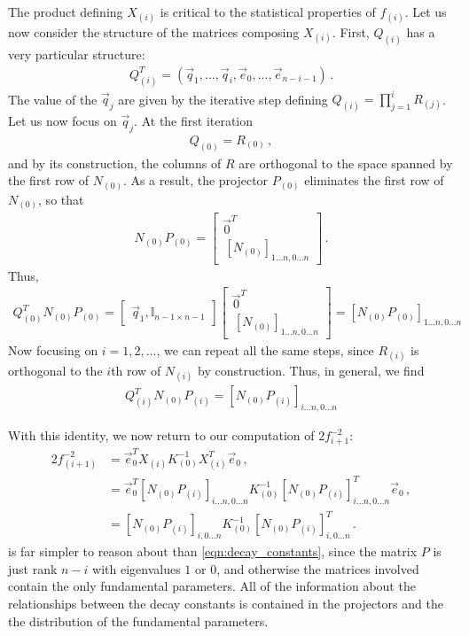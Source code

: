 \documentclass[11pt]{article}
\begin{document}
The product defining $X_{(i)}$ is critical to the statistical properties of $f_{(i)}$. Let us now consider the structure of the matrices composing $X_{(i)}$. First, $Q_{(i)}$ has a very particular structure:
\begin{align}
    Q_{(i)}^T = (\vec q_1,\dots,\vec q_{i},\vec e_0,\dots,\vec e_{n - i-1})\,.
\end{align}
The value of the $\vec q_{j}$ are given by the iterative step defining $Q_{(i)} = \prod_{j = 1}^i R_{(j)}$. Let us now focus on $\vec q_j$. At the first iteration
\begin{align}
    Q_{(0)} = R_{(0)}\,,
\end{align}
and by its construction, the columns of $R$ are orthogonal to the space spanned by the first row of $N_{(0)}$. As a result, the projector $P_{(0)}$ eliminates the first row of $N_{(0)}$, so that
\begin{align}
    N_{(0)}P_{(0)} = \left[\begin{array}{c}\vec 0^T\\\,
    [N_{(0)}]_{1\dots n,0\dots n}\end{array}\right]\,.
\end{align}
Thus,
\begin{align}
    Q_{(0)}^T N_{(0)}P_{(0)} = \left[\begin{array}{cc}\vec q_1,{\mathbb I}_{n-1\times n-1}\end{array}\right]\left[\begin{array}{c}\vec 0^T\\\,
    [N_{(0)}]_{1\dots n,0\dots n}\end{array}\right] = [N_{(0)} P_{(0)}]_{1\dots n,0\dots n}
\end{align}
Now focusing on $i = 1,2,\dots$, we can repeat all the same steps, since $R_{(i)}$ is orthogonal to the $i$th row of $N_{(i)}$ by construction.  Thus, in general, we find
\begin{align}
    Q_{(i)}^T N_{(0)}P_{(i)} = [N_{(0)}P_{(i)}]_{i\dots n,0\dots n}
\end{align}

With this identity, we now return to our computation of $2 f_{i + 1}^{-2}$:
\begin{align}
    2 f_{(i + 1)}^{-2} &=\vec e_0^T X_{(i)} K_{(0)}^{-1}X_{(i)}^T\vec e_0\,,\\
    &=\vec e_0^T [N_{(0)} P_{(i)}]_{i\dots n,0\dots n} K_{(0)}^{-1}[N_{(0)} P_{(i)}]_{i\dots n,0\dots n}^T\vec e_0\,,\\\label{eqn:reduced_f_expression}
    &=[N_{(0)} P_{(i)}]_{i,0\dots n} K_{(0)}^{-1}[N_{(0)} P_{(i)}]_{i,0\dots n}^T\,.
\end{align}
 is far simpler to reason about than \cref{eqn:decay_constants}, since the matrix $P$ is just rank $n - i$ with eigenvalues $1$ or $0$, and otherwise the matrices involved contain the only fundamental parameters. All of the information about the relationships between the decay constants is contained in the projectors and the the distribution of the fundamental parameters.
\end{document}
